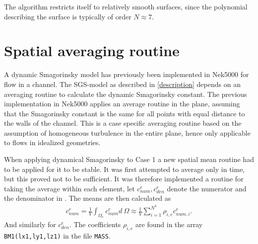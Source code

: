 %
The algorithm restricts itself to relatively smooth surfaces, since the polynomial 
describing the surface is typically of order $N \approx 7$.
%
\section{Spatial averaging routine}
A dynamic Smagorinsky model has previously been implemented in Nek5000 for flow in a channel. 
The SGS-model as described in \cref{description} depends on an averaging routine to calculate
the dynamic Smagorinsky constant. The previous implementation in Nek5000 applies an average routine in the plane,
assuming that the Smagorinsky constant is the same for all points with equal distance to the walls 
of the channel. This is a case specific averaging routine based on the assumption of homogeneous turbulence 
in the entire plane, hence only applicable to flows in idealized geometries.

When applying dynamical Smagorinsky to Case 1 a new spatial mean routine had to be applied for it to be stable. 
It was first attempted to average only in time, but this proved not to be sufficient. It was
therefore implemented a routine for taking the average within each element, let 
$c_{num}^e,c_{den}^e$ denote the numerator and the denominator in .
The means are then calculated as 
\begin{align}
    c_{num}^e = \frac{1}{V}\int_{\Omega_e}c_{num}^e d\: \Omega 
    \approx \frac{1}{V}\sum_{i = 1}^{N^3}\rho_{i,e}c_{num,i}^{e}.
    \label{eq:averageroutine}
\end{align}
And similarly for $c_{den}^e$.
The coefficients $\rho_{i,e}$ are found in the array \verb|BM1(lx1,ly1,lz1)| in the file 
\verb|MASS|.
